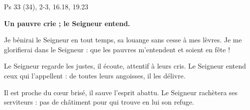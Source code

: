 Ps 33 (34), 2-3, 16.18, 19.23

\textbf{
Un pauvre crie ;
le Seigneur entend.
}

Je bénirai le Seigneur en tout temps,
sa louange sans cesse à mes lèvres.
Je me glorifierai dans le Seigneur :
que les pauvres m’entendent et soient en fête !

\smallskip

Le Seigneur regarde les justes,
il écoute, attentif à leurs cris.
Le Seigneur entend ceux qui l’appellent :
de toutes leurs angoisses, il les délivre.

\smallskip

Il est proche du cœur brisé,
il sauve l’esprit abattu.
Le Seigneur rachètera ses serviteurs :
pas de châtiment pour qui trouve en lui son refuge.
